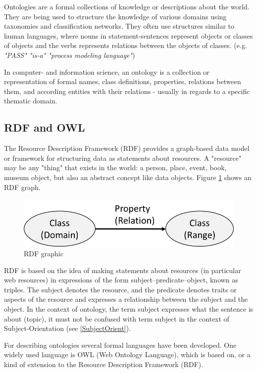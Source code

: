 Ontologies are a formal collections of knowledge or descriptions about the world. They are being used to structure the knowledge of  various domains using taxonomies and classification networks. They often use structures similar to human languages, where nouns in statement-sentences represent objects or classes of objects and the verbs represents relations between the objects of classes. (e.g. \textit{"PASS" "is-a" "process modeling language"})

In computer- and information science, an ontology is a collection or representation of formal names, class definitions, properties, relations between them, and according entities with their relations  - usually in regards to a specific thematic domain.


\subsection{RDF and OWL}

The Resource Description Framework (RDF)\cite{rdf:rdf} provides a graph-based data model or framework for structuring data as statements about resources. A "resource" may be any "thing" that exists in the world: a person, place, event, book, museum object, but also an abstract concept like data objects. Figure \ref{fig:classes-properties}  shows an RDF graph.

\begin{figure}[h]
	\centering
	\includegraphics[width=0.6\linewidth]{Figures/Ontology/Introduction/Classes-Properties}
	\caption[RDF graphic]{RDF graphic}
	\label{fig:classes-properties}
\end{figure}

RDF is based on the idea of making statements about resources (in particular web resources) in expressions of the form subject–predicate–object, known as triples. The subject denotes the resource, and the predicate denotes traits or aspects of the resource and expresses a relationship between the subject and the object. In the context of ontology, the term subject expresses what the sentence is about (topic), it must not be confused with term subject in the context of Subject-Orientation (see \ref{SubjectOrient}).

For describing ontologies several formal languages have been developed. One widely used language is OWL (Web Ontology Language)\cite{w3c:owl}, which is based on, or a kind of extension to the Resource Description Framework (RDF).

